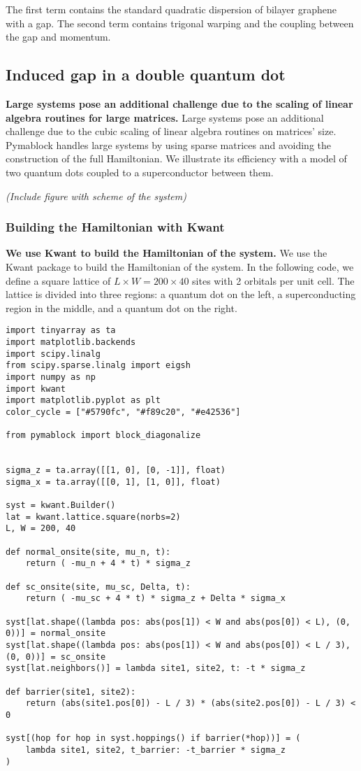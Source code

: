 The first term contains the standard quadratic dispersion of bilayer graphene
with a gap.
The second term contains trigonal warping and the coupling between the gap and
momentum.

\subsection{Induced gap in a double quantum dot}

\textbf{Large systems pose an additional challenge due to the scaling of linear
algebra routines for large matrices.}
Large systems pose an additional challenge due to the cubic scaling of linear algebra
routines on matrices' size.
Pymablock handles large systems by using sparse matrices and avoiding the
construction of the full Hamiltonian.
We illustrate its efficiency with a model of two quantum dots coupled to a
superconductor between them.

\textit{(Include figure with scheme of the system)}

\subsubsection{Building the Hamiltonian with Kwant}

\textbf{We use Kwant to build the Hamiltonian of the system.}
We use the Kwant package \cite{Groth_2014} to build
the Hamiltonian of the system.
In the following code, we define a square lattice of $L \times W = 200 \times
40$ sites with 2 orbitals per unit cell.
The lattice is divided into three regions: a quantum dot on the left, a
superconducting region in the middle, and a quantum dot on the right.

\begin{verbatim}
import tinyarray as ta
import matplotlib.backends
import scipy.linalg
from scipy.sparse.linalg import eigsh
import numpy as np
import kwant
import matplotlib.pyplot as plt
color_cycle = ["#5790fc", "#f89c20", "#e42536"]

from pymablock import block_diagonalize


sigma_z = ta.array([[1, 0], [0, -1]], float)
sigma_x = ta.array([[0, 1], [1, 0]], float)

syst = kwant.Builder()
lat = kwant.lattice.square(norbs=2)
L, W = 200, 40

def normal_onsite(site, mu_n, t):
    return ( -mu_n + 4 * t) * sigma_z

def sc_onsite(site, mu_sc, Delta, t):
    return ( -mu_sc + 4 * t) * sigma_z + Delta * sigma_x

syst[lat.shape((lambda pos: abs(pos[1]) < W and abs(pos[0]) < L), (0, 0))] = normal_onsite
syst[lat.shape((lambda pos: abs(pos[1]) < W and abs(pos[0]) < L / 3), (0, 0))] = sc_onsite
syst[lat.neighbors()] = lambda site1, site2, t: -t * sigma_z

def barrier(site1, site2):
    return (abs(site1.pos[0]) - L / 3) * (abs(site2.pos[0]) - L / 3) < 0

syst[(hop for hop in syst.hoppings() if barrier(*hop))] = (
    lambda site1, site2, t_barrier: -t_barrier * sigma_z
)
\end{verbatim}

